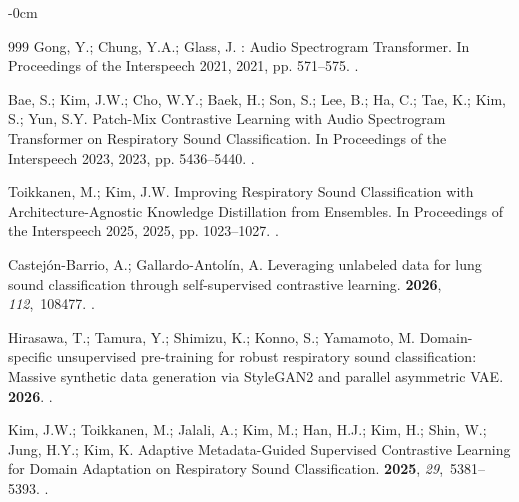\documentclass[algorithms,article,submit,pdftex,oneauthor]{Definitions/mdpi}
\begin{document}
\begin{adjustwidth}{-\extralength}{0cm}
\begin{thebibliography}{999}
Gong, Y.; Chung, Y.A.; Glass, J.
: Audio Spectrogram Transformer.
\newblock In Proceedings of the Interspeech 2021,  2021, pp. 571--575.
.

Bae, S.; Kim, J.W.; Cho, W.Y.; Baek, H.; Son, S.; Lee, B.; Ha, C.; Tae, K.;
  Kim, S.; Yun, S.Y.
\newblock Patch-Mix Contrastive Learning with Audio Spectrogram Transformer on
  Respiratory Sound Classification.
\newblock In Proceedings of the Interspeech 2023,  2023, pp. 5436--5440.
.

Toikkanen, M.; Kim, J.W.
\newblock Improving Respiratory Sound Classification with Architecture-Agnostic
  Knowledge Distillation from Ensembles.
\newblock In Proceedings of the Interspeech 2025,  2025, pp. 1023--1027.
.

Castej{\'o}n-Barrio, A.; Gallardo-Antol{\'i}n, A.
\newblock Leveraging unlabeled data for lung sound classification through
  self-supervised contrastive learning.
 {\bf 2026}, {\em
  112},~108477.
.

Hirasawa, T.; Tamura, Y.; Shimizu, K.; Konno, S.; Yamamoto, M.
\newblock Domain-specific unsupervised pre-training for robust respiratory
  sound classification: Massive synthetic data generation via {StyleGAN2} and
  parallel asymmetric {VAE}.
 {\bf 2026}.
.

Kim, J.W.; Toikkanen, M.; Jalali, A.; Kim, M.; Han, H.J.; Kim, H.; Shin, W.;
  Jung, H.Y.; Kim, K.
\newblock Adaptive Metadata-Guided Supervised Contrastive Learning for Domain
  Adaptation on Respiratory Sound Classification.
 {\bf 2025},
  {\em 29},~5381--5393.
.


\end{thebibliography}
\end{adjustwidth}
\end{document}
